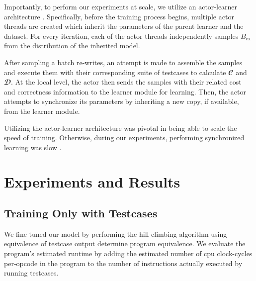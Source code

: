 \documentclass{article}
\begin{document}
Importantly, to perform our experiments at scale, we utilize an actor-learner architecture  \citep{liang2018memory, espeholt2018impala}. Specifically, before the training process begins, multiple actor threads are created which inherit the parameters of the parent learner and the dataset. For every iteration, each of the actor threads independently samples $B_{\textrm{ex}}$ from the distribution of the inherited model. 

After sampling a batch re-writes, an attempt is made to assemble the samples and execute them with their corresponding suite of testcases to calculate $\mathbfcal{C}$ and $\mathbfcal{D}$. At the local level, the actor then sends the samples with their related cost and correctness information to the learner module for learning. Then, the actor attempts to synchronize its parameters by inheriting a new copy, if available, from the learner module.

Utilizing the actor-learner architecture was pivotal in being able to scale the speed of training. Otherwise, during our experiments, performing synchronized learning was slow . 


\section{Experiments and Results}


\subsection{Training Only with Testcases}



We fine-tuned our model by performing the hill-climbing algorithm using equivalence of testcase output determine program equivalence. We evaluate the program's estimated runtime by adding the estimated number of cpu clock-cycles per-opcode in the program to the number of instructions actually executed by running testcases. 
\end{document}
